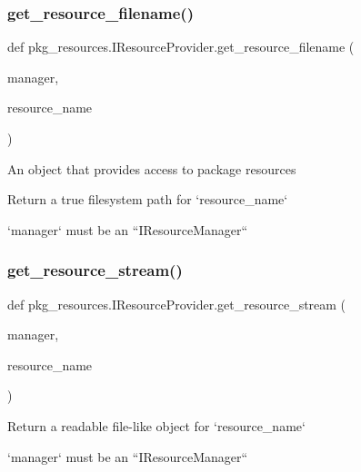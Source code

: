 \subsubsection{\texorpdfstring{get\+\_\+resource\+\_\+filename()}{get\_resource\_filename()}}
{\footnotesize\ttfamily def pkg\+\_\+resources.\+I\+Resource\+Provider.\+get\+\_\+resource\+\_\+filename (\begin{DoxyParamCaption}\item[{}]{manager,  }\item[{}]{resource\+\_\+name }\end{DoxyParamCaption})}

\begin{DoxyVerb}An object that provides access to package resources\end{DoxyVerb}
\begin{DoxyVerb}Return a true filesystem path for `resource_name`

`manager` must be an ``IResourceManager``\end{DoxyVerb}
 \mbox{\label{classpkg__resources_1_1IResourceProvider_ac027f5f8836dadb75f0d05c4d919fa1b}} 
\subsubsection{\texorpdfstring{get\+\_\+resource\+\_\+stream()}{get\_resource\_stream()}}
{\footnotesize\ttfamily def pkg\+\_\+resources.\+I\+Resource\+Provider.\+get\+\_\+resource\+\_\+stream (\begin{DoxyParamCaption}\item[{}]{manager,  }\item[{}]{resource\+\_\+name }\end{DoxyParamCaption})}

\begin{DoxyVerb}Return a readable file-like object for `resource_name`

`manager` must be an ``IResourceManager``\end{DoxyVerb}
 \mbox{\label{classpkg__resources_1_1IResourceProvider_a2c860463185ea5a8c02d904afaa72a31}} 
